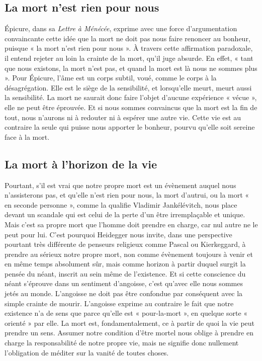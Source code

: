 \subsection{La mort n'est rien pour nous}

Épicure, dans sa {\it Lettre à Ménécée}, exprime avec une force d'argumentation convaincante cette idée que la mort ne doit pas nous faire renoncer au bonheur, puisque « la mort n'est rien pour nous ». À travers cette affirmation paradoxale, il entend rejeter au loin la crainte de la mort, qu'il juge absurde. En effet, « tant que nous existons, la mort n'est pas, et quand la mort est là nous ne sommes plus ». Pour Épicure, l'âme est un corps subtil, voué, comme le corps à la désagrégation. Elle est le siège de la sensibilité, et lorsqu'elle meurt, meurt aussi la sensibilité. La mort ne saurait donc faire l'objet d'aucune expérience « vécue », elle ne peut être éprouvée. Et si nous sommes convaincus que la mort est la fin de tout, nous n'aurons ni à redouter ni à espérer une autre vie. Cette vie est au contraire la seule qui puisse nous apporter le bonheur, pourvu qu'elle soit sereine face à la mort.

\subsection{La mort à l'horizon de la vie}

Pourtant, s'il est vrai que notre propre mort est un évènement auquel nous n'assisterons pas, et qu'elle n'est rien pour nous, la mort d'autrui, ou la mort « en seconde personne », comme la qualifie Vladimir Jankélévitch, nous place devant un scandale qui est celui de la perte d'un être irremplaçable et unique. Mais c'est sa propre mort que l'homme doit prendre en charge, car nul autre ne le peut pour lui. C'est pourquoi Heidegger nous invite, dans une perspective pourtant très différente de penseurs religieux comme Pascal ou Kierkeggard, à prendre au sérieux notre propre mort, non comme évènement toujours à venir et en même temps absolument sûr, mais comme horizon à partir duquel surgit la pensée du néant, inscrit au sein même de l'existence. Et si cette conscience du néant s'éprouve dans un sentiment d'angoisse, c'est qu'avec elle nous sommes jetés au monde. L'angoisse ne doit pas être confondue par conséquent avec la simple crainte de mourir. L'angoisse exprime au contraire le fait que notre existence n'a de sens que parce qu'elle est « pour-la-mort », en quelque sorte « orienté » par elle. La mort est, fondamentalement, ce à partir de quoi la vie peut prendre un sens. Assumer notre condition d'être mortel nous oblige à prendre en charge la responsabilité de notre propre vie, mais ne signifie donc nullement l'obligation de méditer sur la vanité de toutes choses.

